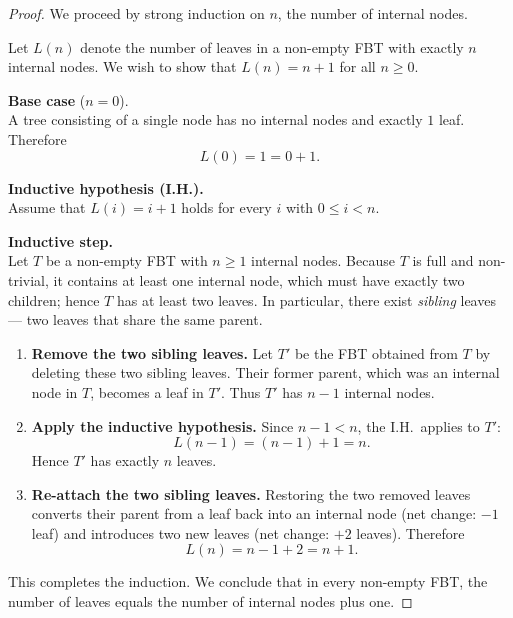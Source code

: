 \documentclass[12pt]{article}
\theoremstyle{definition}
\theoremstyle{plain}
\begin{document}
\begin{proof}
We proceed by strong induction on $n$, the number of internal nodes.

Let $L(n)$ denote the number of leaves in a non-empty FBT with
exactly $n$ internal nodes.  We wish to show that $L(n) = n + 1$ for all $n \ge 0$.

\medskip
\noindent\textbf{Base case} ($n = 0$).\\
A tree consisting of a single node has no internal nodes and exactly $1$ leaf.  Therefore
\[
  L(0) = 1 = 0 + 1.
\]

\medskip
\noindent\textbf{Inductive hypothesis (I.H.).}\\
Assume that $L(i) = i + 1$ holds for every $i$ with $0 \le i < n$.

\medskip
\noindent\textbf{Inductive step.}\\
Let $T$ be a non-empty FBT with $n \ge 1$ internal nodes.
Because $T$ is full and non-trivial, it contains at least one internal node, which
must have exactly two children; hence $T$ has at least two leaves.
In particular, there exist \emph{sibling} leaves — two leaves that share the same
parent.

\begin{enumerate}[label=\arabic*., leftmargin=*, topsep=2pt]
  \item \textbf{Remove the two sibling leaves.}
    Let $T'$ be the FBT obtained from $T$ by deleting these two sibling leaves.
    Their former parent, which was an internal node in $T$, becomes a leaf in $T'$.
    Thus $T'$ has $n - 1$ internal nodes.

  \item \textbf{Apply the inductive hypothesis.}
    Since $n - 1 < n$, the I.H.\ applies to $T'$:
    \[
      L(n-1) = (n-1) + 1 = n.
    \]
    Hence $T'$ has exactly $n$ leaves.

  \item \textbf{Re-attach the two sibling leaves.}
    Restoring the two removed leaves converts their parent from a leaf back into
    an internal node (net change: $-1$ leaf) and introduces two new leaves
    (net change: $+2$ leaves).  Therefore
    \[
      L(n) = n - 1 + 2 = n + 1.
    \]
\end{enumerate}

\noindent
This completes the induction.  We conclude that in every non-empty FBT,
the number of leaves equals the number of internal nodes plus one. \qedhere
\end{proof}
\end{document}
